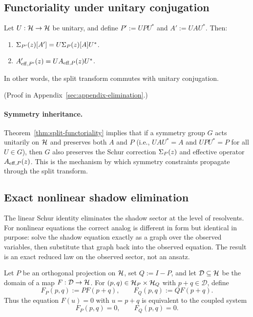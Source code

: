 \subsection{Functoriality under unitary conjugation}

\begin{theorem}
\label{thm:split-functoriality}
Let $U:\mathcal{H} \to \mathcal{H}$ be unitary, and define $P' := UPU^*$ and $A' := UAU^*$.
Then:
\begin{enumerate}[label=(\roman*)]
\item $\Sigma_{P'}(z)[A'] = U \Sigma_{P}(z)[A] U^*$.
\item $A'_{\mathrm{eff},P'}(z) = U A_{\mathrm{eff},P}(z) U^*$.
\end{enumerate}
In other words, the split transform commutes with unitary conjugation.
\end{theorem}

(Proof in Appendix~\ref{sec:appendix-elimination}.)

\paragraph{Symmetry inheritance.}
Theorem~\ref{thm:split-functoriality} implies that if a symmetry group $G$ acts unitarily on $\mathcal{H}$ and preserves both $A$ and $P$ (i.e., $UAU^* = A$ and $UPU^* = P$ for all $U \in G$), then $G$ also preserves the Schur correction $\Sigma_{P}(z)$ and effective operator $A_{\mathrm{eff},P}(z)$.
This is the mechanism by which symmetry constraints propagate through the split transform.

\subsection{Exact nonlinear shadow elimination}

The linear Schur identity eliminates the shadow sector at the level of
resolvents. For nonlinear equations the correct analog is different in form but
identical in purpose: solve the shadow equation exactly as a graph over the
observed variables, then substitute that graph back into the observed equation.
The result is an exact reduced law on the observed sector, not an ansatz.

\begin{definition}
\label{def:nonlinear-pq-split}
Let $P$ be an orthogonal projection on $\mathcal{H}$, set $Q:=I-P$, and let
$\mathcal D\subseteq \mathcal{H}$ be the domain of a map
$F:\mathcal D\to \mathcal{H}$. For $(p,q)\in \mathcal{H}_P\times\mathcal{H}_Q$ with
$p+q\in\mathcal D$, define
\[
F_P(p,q):=PF(p+q),
\qquad
F_Q(p,q):=QF(p+q).
\]
Thus the equation $F(u)=0$ with $u=p+q$ is equivalent to the coupled system
\[
F_P(p,q)=0,
\qquad
F_Q(p,q)=0.
\]
\end{definition}

